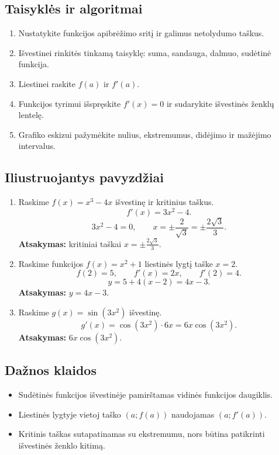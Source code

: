 \subsection{Taisyklės ir algoritmai}
\begin{enumerate}[label=\arabic*.]
\item Nustatykite funkcijos apibrėžimo sritį ir galimus netolydumo taškus.
\item Išvestinei rinkitės tinkamą taisyklę: suma, sandauga, dalmuo, sudėtinė funkcija.
\item Liestinei raskite \(f(a)\) ir \(f'(a)\).
\item Funkcijos tyrimui išspręskite \(f'(x)=0\) ir sudarykite išvestinės ženklų lentelę.
\item Grafiko eskizui pažymėkite nulius, ekstremumus, didėjimo ir mažėjimo intervalus.
\end{enumerate}

\subsection{Iliustruojantys pavyzdžiai}
\begin{enumerate}[label=\arabic*.]
\item Raskime \(f(x)=x^3-4x\) išvestinę ir kritinius taškus.
\[
f'(x)=3x^2-4.
\]
\[
3x^2-4=0,\qquad x=\pm\frac{2}{\sqrt3}=\pm\frac{2\sqrt3}{3}.
\]
\textbf{Atsakymas:} kritiniai taškai \(x=\pm\frac{2\sqrt3}{3}\).

\item Raskime funkcijos \(f(x)=x^2+1\) liestinės lygtį taške \(x=2\).
\[
f(2)=5,\qquad f'(x)=2x,\qquad f'(2)=4.
\]
\[
y=5+4(x-2)=4x-3.
\]
\textbf{Atsakymas:} \(y=4x-3\).

\item Raskime \(g(x)=\sin(3x^2)\) išvestinę.
\[
g'(x)=\cos(3x^2)\cdot6x=6x\cos(3x^2).
\]
\textbf{Atsakymas:} \(6x\cos(3x^2)\).
\end{enumerate}

\subsection{Dažnos klaidos}
\begin{itemize}
\item Sudėtinės funkcijos išvestinėje pamirštamas vidinės funkcijos daugiklis.
\item Liestinės lygtyje vietoj taško \((a;f(a))\) naudojamas \((a;f'(a))\).
\item Kritinis taškas sutapatinamas su ekstremumu, nors būtina patikrinti išvestinės ženklo kitimą.
\end{itemize}

